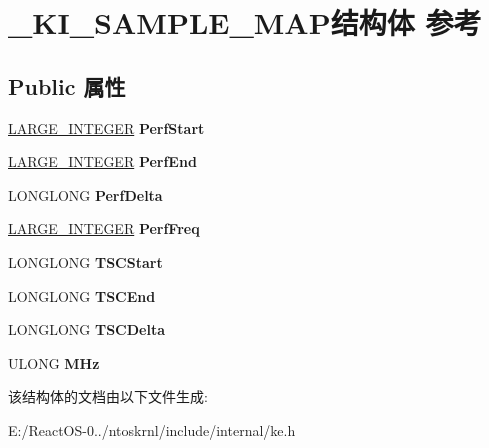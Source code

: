 \hypertarget{struct___k_i___s_a_m_p_l_e___m_a_p}{}\section{\+\_\+\+K\+I\+\_\+\+S\+A\+M\+P\+L\+E\+\_\+\+M\+A\+P结构体 参考}
\label{struct___k_i___s_a_m_p_l_e___m_a_p}
\subsection*{Public 属性}
\begin{DoxyCompactItemize}
\item 
\mbox{\label{struct___k_i___s_a_m_p_l_e___m_a_p_a860e2eb94036dadee163163f88d6c020}} 
\hyperlink{union___l_a_r_g_e___i_n_t_e_g_e_r}{L\+A\+R\+G\+E\+\_\+\+I\+N\+T\+E\+G\+ER} {\bfseries Perf\+Start}
\item 
\mbox{\label{struct___k_i___s_a_m_p_l_e___m_a_p_a0ba3f53538ecea3aae44f05e885fbfc8}} 
\hyperlink{union___l_a_r_g_e___i_n_t_e_g_e_r}{L\+A\+R\+G\+E\+\_\+\+I\+N\+T\+E\+G\+ER} {\bfseries Perf\+End}
\item 
\mbox{\label{struct___k_i___s_a_m_p_l_e___m_a_p_a17551378915e6f5b8a4b32020f83b8ca}} 
L\+O\+N\+G\+L\+O\+NG {\bfseries Perf\+Delta}
\item 
\mbox{\label{struct___k_i___s_a_m_p_l_e___m_a_p_a4e0dcdcda942c05be966a34c0e290fc9}} 
\hyperlink{union___l_a_r_g_e___i_n_t_e_g_e_r}{L\+A\+R\+G\+E\+\_\+\+I\+N\+T\+E\+G\+ER} {\bfseries Perf\+Freq}
\item 
\mbox{\label{struct___k_i___s_a_m_p_l_e___m_a_p_a4e5710cc07244a27dded63010ca1bcdb}} 
L\+O\+N\+G\+L\+O\+NG {\bfseries T\+S\+C\+Start}
\item 
\mbox{\label{struct___k_i___s_a_m_p_l_e___m_a_p_a72e82bdac80b381ab85d125b51a89c32}} 
L\+O\+N\+G\+L\+O\+NG {\bfseries T\+S\+C\+End}
\item 
\mbox{\label{struct___k_i___s_a_m_p_l_e___m_a_p_ac3ae47414748c9d350e5f97dedb5c231}} 
L\+O\+N\+G\+L\+O\+NG {\bfseries T\+S\+C\+Delta}
\item 
\mbox{\label{struct___k_i___s_a_m_p_l_e___m_a_p_a756efea5bb354b284cf5fb431d403da2}} 
U\+L\+O\+NG {\bfseries M\+Hz}
\end{DoxyCompactItemize}


该结构体的文档由以下文件生成\+:\begin{DoxyCompactItemize}
\item 
E\+:/\+React\+O\+S-\/0../ntoskrnl/include/internal/ke.\+h\end{DoxyCompactItemize}
